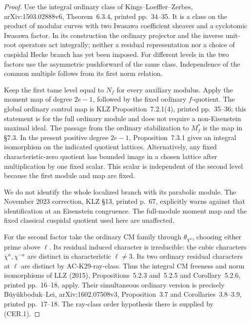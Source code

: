 \begin{proof}
Use the integral ordinary class of
Kings--Loeffler--Zerbes, arXiv:1503.02888v6,
Theorem~6.3.4, printed pp.~34--35.  It is a class on the
product of modular curves with two Iwasawa coefficient sheaves
and a cyclotomic Iwasawa factor.  In its construction the
ordinary projector and the inverse unit-root operators act
integrally; neither a residual representation nor a choice of
cuspidal Hecke branch has yet been imposed.
For different levels in the two factors use the asymmetric
pushforward of the same class.  Independence of the common
multiple follows from its first norm relation.

Keep the first tame level equal to $N_f$ for every auxiliary
modulus.  Apply the moment map of degree $2e-1$, followed by
the fixed ordinary $f$-quotient.  The global ordinary control
map is KLZ Proposition~7.2.1(4), printed pp.~35--36; this
statement is for the full ordinary module and does not require
a non-Eisenstein maximal ideal.  The passage from the ordinary
stabilization to $M_f^*$ is the map in \S7.3.  In the present
positive degree $2e-1$, Proposition~7.3.1 gives an integral
isomorphism on the indicated quotient lattices.  Alternatively,
any fixed characteristic-zero quotient has bounded image in a
chosen lattice after multiplication by one fixed scalar.
This scalar is independent of the second level because the
first module and map are fixed.

We do not identify the whole localized branch with its
parabolic module.  The November 2023 correction, KLZ \S13,
printed p.~67, explicitly warns against that identification
at an Eisenstein congruence.  The full-module moment map and
the fixed classical cuspidal quotient used here are unaffected.

For the second factor take the ordinary CM family through
$\theta_{\chi^a}$, choosing either prime above $\ell$.
Its residual induced character is irreducible: the cubic
characters $\chi^a,\chi^{-a}$ are distinct in characteristic
$\ell\ne3$.  Its two ordinary residual characters at $\ell$
are distinct by AC-K29-ray-class.  Thus the integral CM
freeness and norm isomorphisms of LLZ (2015),
Propositions~5.2.3 and~5.2.5 and Corollary~5.2.6,
printed pp.~16--18, apply.  Their simultaneous ordinary
version is precisely B\"uy\"ukboduk--Lei,
arXiv:1602.07508v3, Proposition~3.7 and Corollaries~3.8--3.9,
printed pp.~17--18.  The ray-class order hypothesis there
is supplied by (CER.1).


\end{proof}
